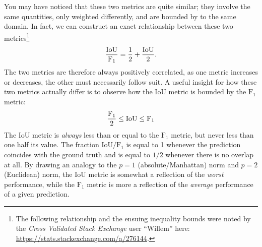 You may have noticed that these two metrics are quite similar; they involve the same quantities, only weighted differently, and are bounded by to the same domain.
In fact, we can construct an exact relationship between these two metrics\footnote{The following relationship and the ensuing inequality bounds were noted by the \textit{Cross Validated Stack Exchange} user \enquote{Willem} here: \url{https://stats.stackexchange.com/a/276144}.}
%
\begin{equation*}
  \frac{%
    \mathrm{IoU}
  }{%
    \mathrm{F_1}
  }
  =
  \frac{1}{2}
  +
  \frac{%
    \mathrm{IoU}
  }{%
    2
  }.
\end{equation*}
%
The two metrics are therefore always positively correlated, as one metric increases or decreases, the other must necessarily follow suit.
A useful insight for how these two metrics actually differ is to observe how the IoU metric is bounded by the $\mathrm{F_1}$ metric:
%
\begin{equation*}
    \frac{%
      \mathrm{F_1}
    }{%
      2
    }
  \leq
    \mathrm{IoU}
  \leq
    \mathrm{F_1}
\end{equation*}
%
The IoU metric is \textit{always} less than or equal to the $\mathrm{F_1}$ metric, but never less than one half its value.
The fraction $\mathrm{IoU} / \mathrm{F_1}$ is equal to 1 whenever the prediction coincides with the ground truth and is equal to $1/2$ whenever there is no overlap at all.
By drawing an analogy to the $p = 1$ (absolute/Manhattan) norm and $p = 2$ (Euclidean) norm, the $\mathrm{IoU}$ metric is somewhat a reflection of the \textit{worst} performance, while the $\mathrm{F_1}$ metric is more a reflection of the \textit{average} performance of a given prediction.
